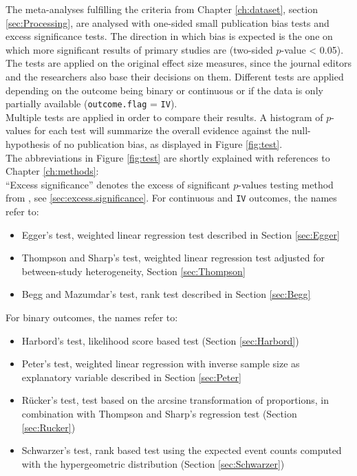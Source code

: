 \documentclass[11pt,a4paper,twoside]{book}\usepackage[]{graphicx}\usepackage[]{color}
\begin{document}
The meta-analyses fulfilling the criteria from Chapter \ref{ch:dataset}, section \ref{sec:Processing}, are analysed with one-sided small publication bias tests and excess significance tests. The direction in which bias is expected is the one on which more significant results of primary studies are (two-sided $p$-value < 0.05). The tests are applied on the original effect size measures, since the journal editors and the researchers also base their decisions on them. Different tests are applied depending on the outcome being binary or continuous or if the data is only partially available (\texttt{outcome.flag} = \texttt{IV}).\\
Multiple tests are applied in order to compare their results. A histogram of $p$-values for each test will summarize the overall evidence against the null-hypothesis of no publication bias, as displayed in Figure \ref{fig:test}.\\
The abbreviations in Figure \ref{fig:test}  are shortly explained with references to Chapter \ref{ch:methods}: \\
``Excess significance'' denotes the excess of significant $p$-values testing method from \citet{excess.significance}, see \ref{sec:excess.significance}. For continuous and \texttt{IV} outcomes, the names refer to: 

\begin{itemize}
\item Egger's test, weighted linear regression test described in Section \ref{sec:Egger}
\item Thompson and Sharp's test, weighted linear regression test adjusted for between-study heterogeneity, Section \ref{sec:Thompson}
\item Begg and Mazumdar's test, rank test described in Section \ref{sec:Begg}
\end{itemize}

For binary outcomes, the names refer to:
\begin{itemize}
\item Harbord's test, likelihood score based test (Section \ref{sec:Harbord})
\item Peter's test, weighted linear regression with inverse sample size as explanatory variable described in Section \ref{sec:Peter}
\item R\"ucker's test, test based on the arcsine transformation of proportions, in combination with Thompson and Sharp's regression test (Section \ref{sec:Rucker})
\item Schwarzer's test, rank based test using the expected event counts computed with the hypergeometric distribution (Section \ref{sec:Schwarzer})
\end{itemize}
\end{document}
